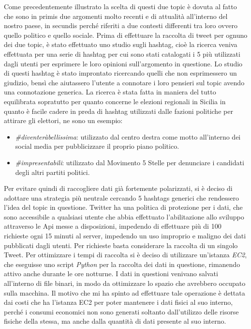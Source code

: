 Come precedentemente illustrato la scelta di questi due topic è dovuta al fatto che sono in primis due argomenti molto recenti e di attualità all'interno del nostro paese, in secundis perché riferiti a due contesti differenti tra loro ovvero quello politico e quello sociale.
Prima di effettuare la raccolta di tweet per ognuno dei due topic, è stato effettuato uno studio sugli hashtag, cioè la ricerca veniva effettuata per una serie di hashtag per cui sono stati catalogati i 5 più utilizzati dagli utenti per esprimere le loro opinioni sull'argomento in questione.
Lo studio di questi hashtag è stato improntato ricercando quelli che non esprimessero un giudizio, bensì che aiutassero l'utente a connotare i loro pensieri sul topic avendo una connotazione generica.
La ricerca è stata fatta in maniera del tutto equilibrata sopratutto per quanto concerne le elezioni regionali in Sicilia in quanto è facile cadere in preda di hashtag utilizzati dalle fazioni politiche per attirare gli elettori, ne sono un esempio:
\begin{itemize}
\item \textit{\#diventeràbellissima}: utilizzato dal centro destra come motto all'interno dei social media per pubblicizzare il proprio piano politico.
\item \textit{\#impresentabili}: utilizzato dal Movimento 5 Stelle per denunciare i candidati degli altri partiti politici.
\end{itemize} 
Per evitare quindi di raccogliere dati già fortemente polarizzati, si è deciso di adottare una strategia più neutrale cercando 5 hashtags generici che rendessero l'idea del topic in questione.
Twitter ha una politica di protezione per i dati, che sono accessibile a qualsiasi utente che abbia effettuato l'abilitazione allo sviluppo attraverso le Api messe a disposizioni, impedendo di effettuare più di 100 richieste ogni 15 minuti al server, impedendo un uso improprio e maligno dei dati pubblicati dagli utenti. Per richieste basta considerare la raccolta di un singolo Tweet.
Per ottimizzare i tempi di raccolta si è deciso di utilizzare un'istanza \textit{EC2}, che eseguisse uno script \textit{Python} per la raccolta dei dati in questione, rimanendo attivo anche durante le ore notturne.
I dati in questioni venivano salvati all'interno di file binari, in modo da ottimizzare lo spazio che avrebbero occupato sulla macchina.
Il motivo che mi ha spinto ad effettuare tale operazione è dettata dai costi che ha l'istanza EC2 per poter mantenere i dati fisici al suo interno, perché i consumi economici non sono generati soltanto dall'utilizzo delle risorse fisiche della stessa, ma anche dalla quantità di dati presente al suo interno.
 

